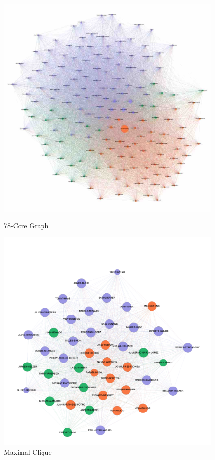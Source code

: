 \documentclass[runningheads]{llncs}
\begin{document}
\begin{figure}[H]
    \centering
    \begin{minipage}{0.5\textwidth}
        \centering
        \includegraphics[width=\textwidth]{2_k_core_my} %
        \caption{78-Core Graph}
        \label{fig_2_k_core_my}
    \end{minipage}\hfill
    \begin{minipage}{0.5\textwidth}
        \centering
        \includegraphics[width=\textwidth]{2_max_clique} %
        \caption{Maximal Clique}
        \label{fig_2_max_clique}
    \end{minipage}
\end{figure}
\end{document}
